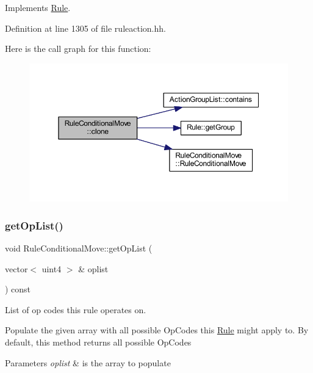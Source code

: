 Implements \mbox{\hyperlink{class_rule_a70de90a76461bfa7ea0b575ce3c11e4d}{Rule}}.



Definition at line 1305 of file ruleaction.\+hh.

Here is the call graph for this function\+:
\nopagebreak
\begin{figure}[H]
\begin{center}
\leavevmode
\includegraphics[width=350pt]{class_rule_conditional_move_a708caed50cbe0b065ed64b15100cfad2_cgraph}
\end{center}
\end{figure}
\mbox{\label{class_rule_conditional_move_aea21a4a8a9848b3cfa3524eec1a416eb}} 
\subsubsection{\texorpdfstring{getOpList()}{getOpList()}}
{\footnotesize\ttfamily void Rule\+Conditional\+Move\+::get\+Op\+List (\begin{DoxyParamCaption}\item[{vector$<$ uint4 $>$ \&}]{oplist }\end{DoxyParamCaption}) const\hspace{0.3cm}{\ttfamily [virtual]}}



List of op codes this rule operates on. 

Populate the given array with all possible Op\+Codes this \mbox{\hyperlink{class_rule}{Rule}} might apply to. By default, this method returns all possible Op\+Codes 
\begin{DoxyParams}{Parameters}
{\em oplist} & is the array to populate \\
\hline
\end{DoxyParams}



